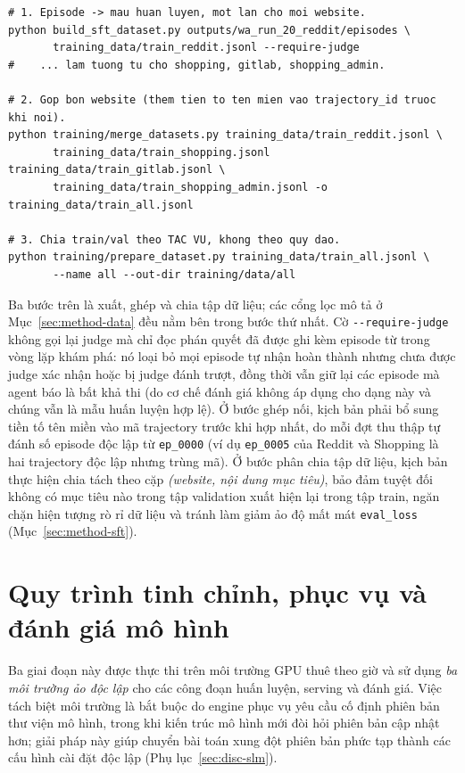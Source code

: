 \begin{lstlisting}[style=mystyle,numbers=none,basicstyle=\scriptsize\ttfamily]
# 1. Episode -> mau huan luyen, mot lan cho moi website.
python build_sft_dataset.py outputs/wa_run_20_reddit/episodes \
       training_data/train_reddit.jsonl --require-judge
#    ... lam tuong tu cho shopping, gitlab, shopping_admin.

# 2. Gop bon website (them tien to ten mien vao trajectory_id truoc khi noi).
python training/merge_datasets.py training_data/train_reddit.jsonl \
       training_data/train_shopping.jsonl training_data/train_gitlab.jsonl \
       training_data/train_shopping_admin.jsonl -o training_data/train_all.jsonl

# 3. Chia train/val theo TAC VU, khong theo quy dao.
python training/prepare_dataset.py training_data/train_all.jsonl \
       --name all --out-dir training/data/all
\end{lstlisting}

\noindent
Ba bước trên là xuất, ghép và chia tập dữ liệu; các cổng lọc mô tả ở
Mục~\ref{sec:method-data} đều nằm bên trong bước thứ nhất. Cờ
\texttt{-{}-require-judge} không gọi lại judge mà chỉ đọc phán quyết đã được
ghi kèm episode từ trong vòng lặp khám phá: nó loại bỏ mọi episode tự
nhận hoàn thành nhưng chưa được judge xác nhận hoặc bị judge đánh trượt, đồng
thời vẫn giữ lại các episode mà agent báo là bất khả thi (do cơ chế đánh giá
không áp dụng cho dạng này và chúng vẫn là mẫu huấn luyện hợp lệ). Ở bước ghép
nối, kịch bản phải bổ sung tiền tố tên miền vào mã trajectory trước khi hợp
nhất, do mỗi đợt thu thập tự đánh số episode độc lập từ \texttt{ep\_0000} (ví dụ
\texttt{ep\_0005} của Reddit và Shopping là hai trajectory độc lập nhưng trùng
mã). Ở bước phân chia tập dữ liệu, kịch bản thực hiện chia tách theo cặp
\emph{(website, nội dung mục tiêu)}, bảo đảm tuyệt đối không có mục tiêu nào trong tập validation xuất hiện lại trong tập train, ngăn chặn hiện tượng rò rỉ dữ liệu và tránh làm giảm ảo độ mất mát
\texttt{eval\_loss} (Mục~\ref{sec:method-sft}).

\section{Quy trình tinh chỉnh, phục vụ và đánh giá mô hình}
\label{app:repro-train}

Ba giai đoạn này được thực thi trên môi trường GPU thuê theo giờ và sử dụng
\emph{ba môi trường ảo độc lập} cho các công đoạn huấn luyện, serving
và đánh giá. Việc tách biệt môi trường là bắt buộc do engine phục vụ yêu cầu cố
định phiên bản thư viện mô hình, trong khi kiến trúc mô hình mới đòi hỏi phiên bản
cập nhật hơn; giải pháp này giúp chuyển bài toán xung đột phiên bản phức tạp
thành các cấu hình cài đặt độc lập (Phụ lục~\ref{sec:disc-slm}).

